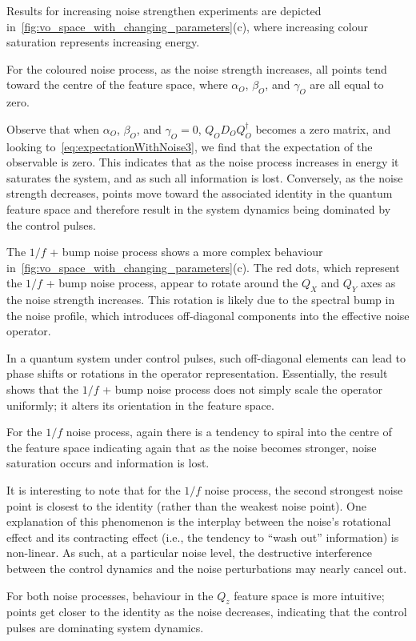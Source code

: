 \documentclass[12pt]{iopart}
\begin{document}
Results for increasing noise strengthen experiments are depicted in~\cref{fig:vo_space_with_changing_parameters}(c), where increasing colour saturation represents increasing energy.

For the coloured noise process, as the noise strength increases, all points tend toward the centre of the feature space, where $\alpha_O$, $\beta_O$, and $\gamma_O$ are all equal to zero.

Observe that when $\alpha_O$, $\beta_O$, and $\gamma_O = 0$, $Q_OD_OQ_O^{\dagger}$ becomes a zero matrix, and looking to~\cref{eq:expectationWithNoise3}, we find that the expectation of the observable is zero. This indicates that as the noise process increases in energy it saturates the system, and as such all information is lost. Conversely, as the noise strength decreases, points move toward the associated identity in the quantum feature space and therefore result in the system dynamics being dominated by the control pulses.

The $1/f$ + bump noise process shows a more complex behaviour in~\cref{fig:vo_space_with_changing_parameters}(c). The red dots, which represent the $1/f$ + bump noise process, appear to rotate around the $Q_X$ and $Q_Y$ axes as the noise strength increases. This rotation is likely due to the spectral bump in the noise profile, which introduces off-diagonal components into the effective noise operator.

In a quantum system under control pulses, such off-diagonal elements can lead to phase shifts or rotations in the operator representation. Essentially, the result shows that the $1/f$ + bump noise process does not simply scale the operator uniformly; it alters its orientation in the feature space.

For the $1/f$ noise process, again there is a tendency to spiral into the centre of the feature space indicating again that as the noise becomes stronger, noise saturation occurs and information is lost.

It is interesting to note that for the $1/f$ noise process, the second strongest noise point is closest to the identity (rather than the weakest noise point). One explanation of this phenomenon is the interplay between the noise's rotational effect and its contracting effect (i.e., the tendency to “wash out” information) is non-linear. As such, at a particular noise level, the destructive interference between the control dynamics and the noise perturbations may nearly cancel out.

For both noise processes, behaviour in the $Q_z$ feature space is more intuitive; points get closer to the identity as the noise decreases, indicating that the control pulses are dominating system dynamics.
\end{document}
